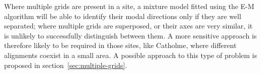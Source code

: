 \documentclass[../../ArchStats.tex]{subfiles}
\begin{document}
Where multiple grids are present in a site, a mixture model fitted using the E-M algorithm will be able to identify their modal directions only if they are well separated; where multiple grids are superposed, or their axes are very similar, it is unlikely to successfully distinguish between them. A more sensitive approach is therefore likely to be required in those sites, like  Catholme, where different alignments coexist in a small area. A possible approach to this type of problem is proposed in section~\ref{sec:multiple-grids}.







\end{document}
